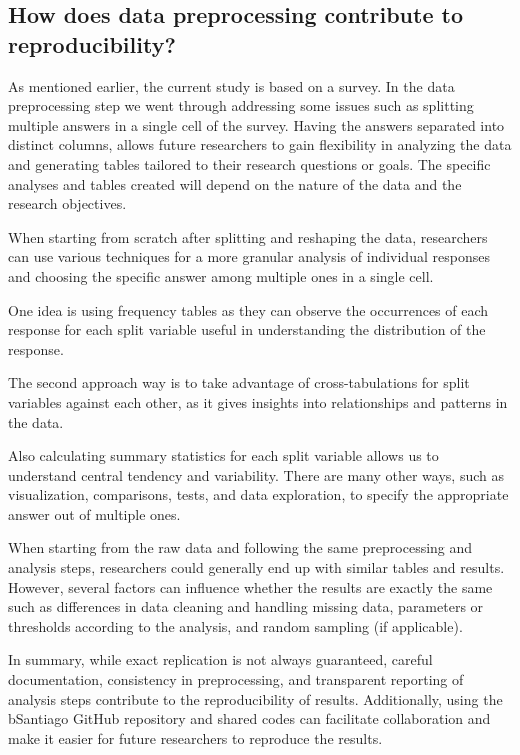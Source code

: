 \documentclass[
]{article}
\begin{document}
\hypertarget{how-does-data-preprocessing-contribute-to-reproducibility}{%
\subsection{How does data preprocessing contribute to
reproducibility?}\label{how-does-data-preprocessing-contribute-to-reproducibility}}

As mentioned earlier, the current study is based on a survey. In the
data preprocessing step we went through addressing some issues such as
splitting multiple answers in a single cell of the survey. Having the
answers separated into distinct columns, allows future researchers to
gain flexibility in analyzing the data and generating tables tailored to
their research questions or goals. The specific analyses and tables
created will depend on the nature of the data and the research
objectives.

When starting from scratch after splitting and reshaping the data,
researchers can use various techniques for a more granular analysis of
individual responses and choosing the specific answer among multiple
ones in a single cell.

One idea is using frequency tables as they can observe the occurrences
of each response for each split variable useful in understanding the
distribution of the response.

The second approach way is to take advantage of cross-tabulations for
split variables against each other, as it gives insights into
relationships and patterns in the data.

Also calculating summary statistics for each split variable allows us to
understand central tendency and variability. There are many other ways,
such as visualization, comparisons, tests, and data exploration, to
specify the appropriate answer out of multiple ones.

When starting from the raw data and following the same preprocessing and
analysis steps, researchers could generally end up with similar tables
and results. However, several factors can influence whether the results
are exactly the same such as differences in data cleaning and handling
missing data, parameters or thresholds according to the analysis, and
random sampling (if applicable).

In summary, while exact replication is not always guaranteed, careful
documentation, consistency in preprocessing, and transparent reporting
of analysis steps contribute to the reproducibility of results.
Additionally, using the bSantiago GitHub repository and shared codes can
facilitate collaboration and make it easier for future researchers to
reproduce the results.
\end{document}
